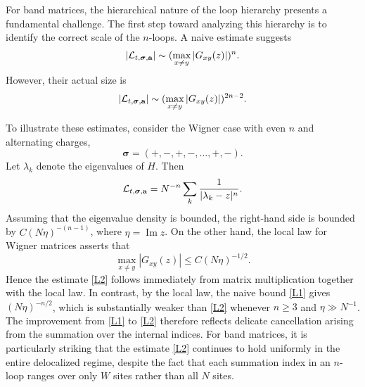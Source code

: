 \documentclass[10pt,reqno]{article}
\DeclareMathOperator{\im}{{\mathrm{Im}}}
\def\Im{\im }
\theoremstyle{plain} %
\theoremstyle{remark}
\numberwithin{equation}{section}
\begin{document}
\bigskip 

For band matrices, the hierarchical nature of the loop hierarchy presents a fundamental challenge. The first step toward analyzing this hierarchy is to identify the correct scale of the \(n\)-loops. A naive estimate suggests
\begin{align}\label{L1}
|{\cal L}_{t, \boldsymbol{\sigma}, \textbf{a}}| \sim  ( \max_{x \ne y} |G_{xy}(z)|  )^n.
\end{align}
However, their actual size is
\begin{align}\label{L2}
|{\cal L}_{t, \boldsymbol{\sigma}, \textbf{a}}| \sim  ( \max_{x \ne y} |G_{xy}(z)| )^{2n-2}.
\end{align}

To illustrate these estimates, consider the Wigner case with even \(n\) and alternating charges,
\[
\boldsymbol{\sigma}=(+,-,+,-,\ldots,+,-).
\]
Let \(\lambda_k\) denote the eigenvalues of \(H\). Then
\[
{\cal L}_{t, \boldsymbol{\sigma}, \textbf{a}}
= N^{-n} \sum_k \frac 1 {|\lambda_k-z|^n}.
\]
Assuming that the eigenvalue density is bounded, the right-hand side is bounded by
\(C(N\eta)^{-(n-1)}\), where \(\eta=\Im z\). On the other hand, the local law for Wigner matrices asserts that
\[
\max_{x \ne y} |G_{xy}(z)| \le C (N \eta)^{-1/2}.
\]
Hence the estimate \eqref{L2} follows immediately from matrix multiplication together with the local law. In contrast, by the local law, the naive bound \eqref{L1} gives \((N\eta)^{-n/2}\), which is substantially weaker than \eqref{L2} whenever \(n\ge3\) and \(\eta\gg N^{-1}\). The improvement from \eqref{L1} to \eqref{L2} therefore reflects delicate cancellation arising from the summation over the internal indices. 
For band matrices, it is particularly striking that the estimate \eqref{L2} continues to hold uniformly in the entire delocalized regime, despite the fact that each summation index in an \(n\)-loop ranges over only \(W\) sites rather than all \(N\) sites.
\end{document}
